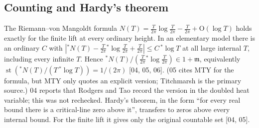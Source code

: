 \documentclass[11pt,a4paper]{article}
\numberwithin{equation}{section}
\theoremstyle{definition}
\theoremstyle{remark}
\newcommand{\mm}{\mathfrak m}
\newcommand{\st}{\operatorname{st}}
\newcommand{\src}[1]{\textup{[#1]}}
\newcommand{\bigO}{\mathrm{O}}
\begin{document}
\subsection{Counting and Hardy's theorem}\label{gz:sec:counting}
The Riemann--von Mangoldt formula
$N(T)=\frac T{2\pi}\log\frac T{2\pi}-\frac T{2\pi}+\bigO(\log T)$
\cite{Titch,DLMFzeros} holds exactly for the finite lift at every ordinary
height. In an elementary model there is an ordinary $C$ with
$|{}^*N(T)-\frac T{2\pi}{}^*\log\frac T{2\pi}+\frac T{2\pi}|\le C\,{}^*\log T$ at all
large internal $T$, including every infinite $T$. Hence
${}^*N(T)/(\frac T{2\pi}{}^*\log\frac T{2\pi})\in1+\mm$, equivalently
$\st({}^*N(T)/(T\,{}^*\log T))=1/(2\pi)$ \src{04, 05, 06}. (05 cites MTY for the
formula, but MTY only quotes an explicit version; Titchmarsh is the primary
source.) 04 reports that Rodgers and Tao record the version in the doubled
heat variable; this was not rechecked. Hardy's theorem, in the form ``for
every real bound there is a critical-line zero above it'', transfers to zeros
above every internal bound. For the finite lift it gives only the original
countable set \src{04, 05}.
\end{document}
